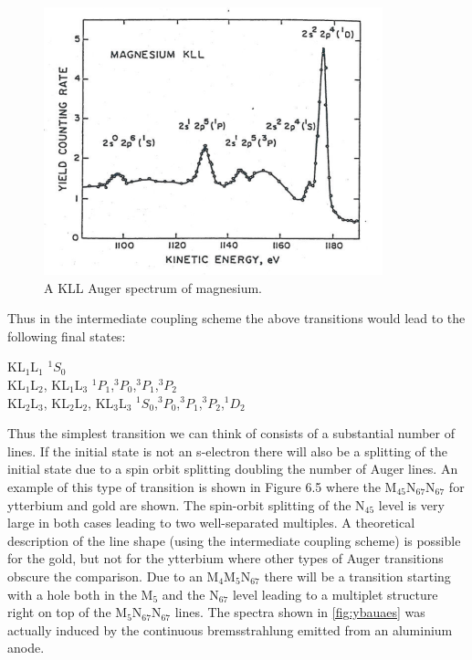 \begin{figure}[h!]
	\begin{center}
	\includegraphics[scale=4]{figures/06_04.png}
	\caption{A KLL Auger spectrum of magnesium.}
	\label{fig:mgaes}
	\end{center}
\end{figure}

Thus in the intermediate coupling scheme the above transitions would lead to the following final states:

             \vspace{0.5cm}

          \noindent     KL$_1$L$_1$      \hfill      $^1S_0$\\
          KL$_1$L$_2$,           KL$_1$L$_3$            \hfill
          $^1P_1$,$^3P_0$,$^3P_1$,$^3P_2$\\
          KL$_2$L$_3$, KL$_2$L$_2$,  KL$_3$L$_3$   \hfill
          $^1S_0$,$^3P_0$,$^3P_1$,$^3P_2$,$^1D_2$\\

          \vspace{0.5cm}

Thus the simplest transition we can think of consists of a substantial number of lines. If the initial state is not an s-electron there will also be a splitting of the initial state due to a spin orbit splitting doubling the number of Auger lines. An example of this type of transition is shown in Figure 6.5 where the M$_{45}$N$_{67}$N$_{67}$ for ytterbium and gold are shown. The spin-orbit splitting of the N$_{45}$ level is very large in both cases leading to two well-separated multiples. A theoretical description of the line shape (using the intermediate coupling  scheme) is possible for the gold, but not for the ytterbium where other types of Auger transitions obscure the comparison. Due to an M$_{4}$M$_{5}$N$_{67}$ there will be a transition starting with a hole both in the M$_{5}$ and the N$_{67}$ level leading to a multiplet structure right on top of the M$_{5}$N$_{67}$N$_{67}$ lines. The spectra shown in \autoref{fig:ybauaes} was actually induced by the continuous bremsstrahlung emitted from an aluminium anode.

